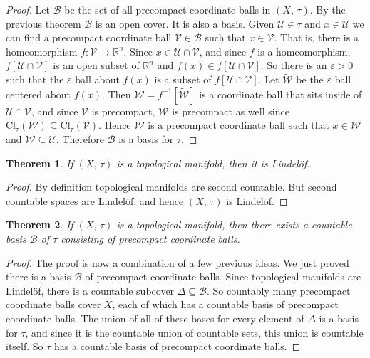 \documentclass{article}
\theoremstyle{plain}
\newtheorem{theorem}{Theorem}[section]
\theoremstyle{normal}
\begin{document}
        \begin{proof}
            Let $\mathcal{B}$ be the set of all precompact coordinate balls in
            $(X,\,\tau)$. By the previous theorem $\mathcal{B}$ is an open
            cover. It is also a basis. Given $\mathcal{U}\in\tau$ and
            $x\in\mathcal{U}$ we can find a precompact coordinate ball
            $\mathcal{V}\in\mathcal{B}$ such that $x\in\mathcal{V}$. That is,
            there is a homeomorphism $f:\mathcal{V}\rightarrow\mathbb{R}^{n}$.
            Since $x\in\mathcal{U}\cap\mathcal{V}$, and since $f$ is a
            homeomorphism, $f[\mathcal{U}\cap\mathcal{V}]$ is an open subset of
            $\mathbb{R}^{n}$ and $f(x)\in{f}[\mathcal{U}\cap\mathcal{V}]$. So
            there is an $\varepsilon>0$ such that the $\varepsilon$ ball about
            $f(x)$ is a subset of $f[\mathcal{U}\cap\mathcal{V}]$. Let
            $\tilde{\mathcal{W}}$ be the $\varepsilon$ ball centered about
            $f(x)$. Then $\mathcal{W}=f^{-1}[\tilde{\mathcal{W}}]$ is a
            coordinate ball that sits inside of $\mathcal{U}\cap\mathcal{V}$,
            and since $\mathcal{V}$ is precompact, $\mathcal{W}$ is precompact
            as well since
            $\textrm{Cl}_{\tau}(\mathcal{W})\subseteq\textrm{Cl}_{\tau}(\mathcal{V})$.
            Hence $\mathcal{W}$ is a precompact coordinate ball such that
            $x\in\mathcal{W}$ and $\mathcal{W}\subseteq\mathcal{U}$. Therefore
            $\mathcal{B}$ is a basis for $\tau$.
        \end{proof}
        \begin{theorem}
            If $(X,\,\tau)$ is a topological manifold, then it is Lindel\"{o}f.
        \end{theorem}
        \begin{proof}
            By definition topological manifolds are second countable. But
            second countable spaces are Lindel\"{o}f, and hence
            $(X,\,\tau)$ is Lindel\"{o}f.
        \end{proof}
        \begin{theorem}
            If $(X,\,\tau)$ is a topological manifold, then there exists a
            countable basis $\mathcal{B}$ of $\tau$ consisting of precompact
            coordinate balls.
        \end{theorem}
        \begin{proof}
            The proof is now a combination of a few previous ideas. We just
            proved there is a basis $\mathcal{B}$ of precompact coordinate
            balls. Since topological manifolds are Lindel\"{o}f, there is a
            countable subcover $\Delta\subseteq\mathcal{B}$. So countably many
            precompact coordinate balls cover $X$, each of which has a countable
            basis of precompact coordinate balls. The union of all of these
            bases for every element of $\Delta$ is a basis for $\tau$, and
            since it is the countable union of countable sets, this union is
            countable itself. So $\tau$ has a countable basis of
            precompact coordinate balls.
        \end{proof}
\end{document}
